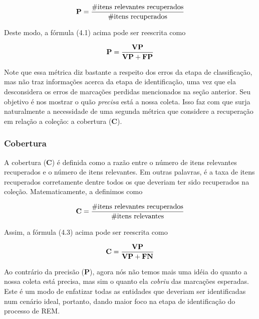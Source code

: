 \documentclass[11pt]{report}
\begin{document}
\begin{equation}
 \text{\textbf{P}} = \dfrac{\text{\#itens relevantes recuperados}}{\text{\#itens recuperados}}
\end{equation}

Deste modo, a fórmula (4.1) acima pode ser reescrita como

\begin{equation}
 \text{\textbf{P}} = \dfrac{\text{\textbf{VP}}}{\text{\textbf{VP}} + \text{\textbf{FP}}}
\end{equation}

Note que essa métrica diz bastante 
a respeito dos erros da etapa de classificação, mas não traz informações acerca da etapa de identificação, uma vez que ela desconsidera os erros de
marcações perdidas mencionados na seção anterior. Seu objetivo é nos mostrar o quão \textit{precisa} está a nossa coleta. Isso faz com que surja naturalmente a necessidade de uma segunda métrica que considere a recuperação em relação a coleção: a cobertura (\textbf{C}).

\subsubsection{Cobertura}

\indent\indent A cobertura (\textbf{C}) é definida como a razão entre o número de itens relevantes recuperados e o número de itens relevantes.
Em outras palavras, é a taxa de itens recuperados corretamente dentre todos os que deveriam ter sido recuperados na coleção. Matematicamente, a definimos como

\begin{equation}
 \text{\textbf{C}} = \dfrac{\text{\#itens relevantes recuperados}}{\text{\#itens relevantes}}
\end{equation}

Assim, a fórmula (4.3) acima pode ser reescrita como

\begin{equation}
 \text{\textbf{C}} = \dfrac{\text{\textbf{VP}}}{\text{\textbf{VP}} + \text{\textbf{FN}}}
\end{equation}

Ao contrário da precisão (\textbf{P}), agora nós não temos mais uma idéia do quanto a nossa coleta está precisa, mas sim o quanto ela \textit{cobriu} das marcações esperadas. Este é um modo de enfatizar todas as entidades que deveriam ser identificadas num cenário ideal, portanto, dando maior foco na etapa de identificação do processo de REM.
\end{document}
